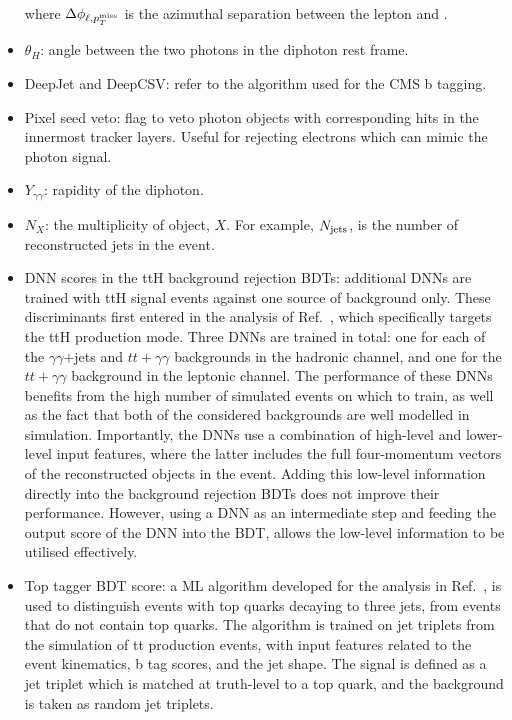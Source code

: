 \begin{itemize}
\begin{equation}
    \end{equation}
    \noindent
    where $\Delta\phi_{\ell,p^\textrm{miss}_{T}}$ is the azimuthal separation between the lepton and \met.
    \item $\theta_H$: angle between the two photons in the diphoton rest frame.
    \item DeepJet and DeepCSV: refer to the algorithm used for the CMS b tagging.
    \item Pixel seed veto: flag to veto photon objects with corresponding hits in the innermost tracker layers. Useful for rejecting electrons which can mimic the photon signal.
    \item $Y_{\gamma\gamma}$: rapidity of the diphoton.
    \item $N_{X}$: the multiplicity of object, $X$. For example, $N_{\rm{jets}}$, is the number of reconstructed jets in the event.
    \item DNN scores in the ttH background rejection BDTs: additional DNNs are trained with ttH signal events against one source of background only. These discriminants first entered in the \Hgg analysis of Ref.~\cite{Sirunyan:2020sum}, which specifically targets the ttH production mode. Three DNNs are trained in total: one for each of the $\gamma\gamma$+jets and $tt+\gamma\gamma$ backgrounds in the hadronic channel, and one for the $tt+\gamma\gamma$ background in the leptonic channel. The performance of these DNNs benefits from the high number of simulated events on which to train, as well as the fact that both of the considered backgrounds are well modelled in simulation. Importantly, the DNNs use a combination of high-level and lower-level input features, where the latter includes the full four-momentum vectors of the reconstructed objects in the event. Adding this low-level information directly into the background rejection BDTs does not improve their performance. However, using a DNN as an intermediate step and feeding the output score of the DNN into the BDT, allows the low-level information to be utilised effectively.
    \item Top tagger BDT score: a ML algorithm developed for the analysis in Ref.~\cite{Sirunyan:2017wif}, is used to distinguish events with top quarks decaying to three jets, from events that do not contain top quarks. The algorithm is trained on jet triplets from the simulation of tt production events, with input features related to the event kinematics, b tag scores, and the jet shape. The signal is defined as a jet triplet which is matched at truth-level to a top quark, and the background is taken as random jet triplets.
\end{itemize}


